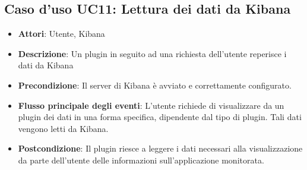 \subsection{Caso d'uso UC11: Lettura dei dati da Kibana}
\begin{itemize}
\item \textbf{Attori}: Utente, Kibana
\item \textbf{Descrizione}: Un plugin in seguito ad una richiesta dell'utente reperisce i dati da Kibana
\item \textbf{Precondizione}: Il server di Kibana è avviato e correttamente configurato.
\item \textbf{Flusso principale degli eventi}: L'utente richiede di visualizzare da un plugin dei dati in una forma specifica, dipendente dal tipo di plugin. Tali dati vengono letti da Kibana.
\item \textbf{Postcondizione}: Il plugin riesce a leggere i dati necessari alla visualizzazione da parte dell'utente delle informazioni sull'applicazione monitorata.
\end{itemize}
